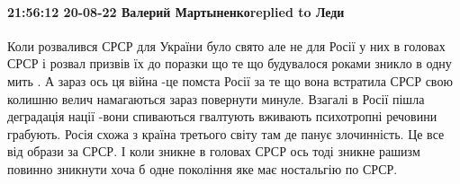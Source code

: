  
 
 
 
 

\paragraph{21:56:12 20-08-22 Валерий Мартыненкоreplied to Леди}

Коли розвалився СРСР для України було свято але не для Росії у них в
головах СРСР і розвал призвів їх до поразки що те що будувалося роками
зникло в одну мить . А зараз ось ця війна -це помста Росії за те що вона
встратила СРСР свою колишню велич намагаються зараз повернути минуле.
Взагалі в Росії пішла деградація нації -вони спиваються гвалтують
вживають психотропні речовини грабують. Росія схожа з країна третього
світу там де панує злочинність.
Це все від образи за СРСР. І коли
зникне в головах СРСР ось тоді зникне рашизм повинно зникнути хоча б
одне покоління яке має ностальгію по СРСР.
